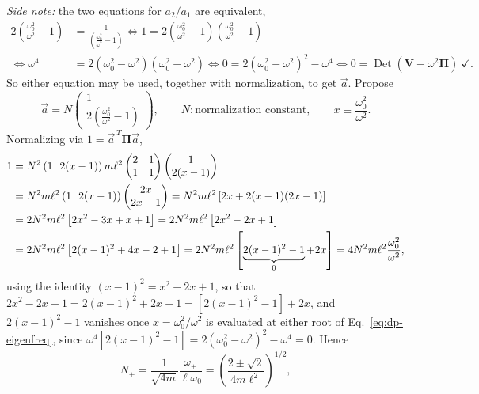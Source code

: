 \documentclass[11pt]{article}
\newcommand{\bV}{\mathbf{V}}
\newcommand{\bPi}{\bm{\Pi}}
\DeclareMathOperator{\Det}{Det}
\begin{document}
\noindent\textit{Side note:} the two equations for $a_2/a_1$ are equivalent,
\begin{align}
2\left(\frac{\omega_0^2}{\omega^2}-1\right) &= \frac{1}{\left(\frac{\omega_0^2}{\omega^2}-1\right)} \iff 1 = 2\left(\frac{\omega_0^2}{\omega^2}-1\right)\left(\frac{\omega_0^2}{\omega^2}-1\right)\\
\iff \omega^4 &= 2(\omega_0^2-\omega^2)(\omega_0^2-\omega^2) \iff 0 = 2(\omega_0^2-\omega^2)^2-\omega^4 \iff 0=\Det(\bV-\omega^2\bPi) \ \checkmark.
\end{align}
So either equation may be used, together with normalization, to get $\vec a$. Propose
\begin{equation}
\vec a = N\begin{pmatrix}1\\ 2\left(\frac{\omega_0^2}{\omega^2}-1\right)\end{pmatrix}, \qquad N: \text{normalization constant}, \qquad x\equiv\frac{\omega_0^2}{\omega^2}.
\end{equation}
Normalizing via $1 = \vec a^{\,T}\bPi\vec a$,
\begin{align}
1 &= N^2\left(1\ \ 2(x-1)\right)m\ell^2\begin{pmatrix}2&1\\1&1\end{pmatrix}\begin{pmatrix}1\\2(x-1)\end{pmatrix}\notag\\
&= N^2 m\ell^2\left(1\ \ 2(x-1)\right)\begin{pmatrix}2x\\2x-1\end{pmatrix} = N^2 m\ell^2\left[2x+2(x-1)(2x-1)\right]\notag\\
&= 2N^2m\ell^2\left[2x^2-3x+x+1\right] = 2N^2m\ell^2\left[2x^2-2x+1\right]\notag\\
&= 2N^2m\ell^2\left[2(x-1)^2+4x-2+1\right] = 2N^2m\ell^2\left[\underbrace{2(x-1)^2-1}_{0}+2x\right] = 4N^2m\ell^2\frac{\omega_0^2}{\omega^2},
\end{align}
using the identity $(x-1)^2 = x^2-2x+1$, so that $2x^2-2x+1 = 2(x-1)^2+2x-1 = \left[2(x-1)^2-1\right]+2x$, and $2(x-1)^2-1$ vanishes once $x=\omega_0^2/\omega^2$ is evaluated at either root of Eq.~\eqref{eq:dp-eigenfreq}, since $\omega^4\left[2(x-1)^2-1\right] = 2(\omega_0^2-\omega^2)^2-\omega^4 = 0$. Hence
\begin{equation}
\boxed{N_\pm = \frac{1}{\sqrt{4m}}\frac{\omega_\pm}{\ell\omega_0} = \left(\frac{2\pm\sqrt2}{4m\ell^2}\right)^{1/2},}
\end{equation}
\end{document}
